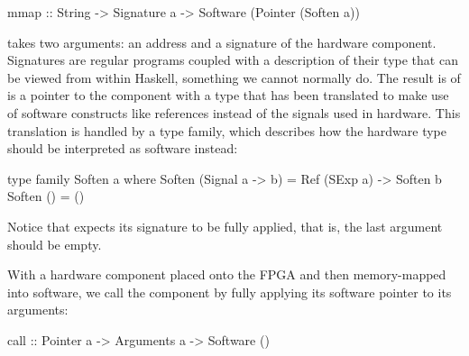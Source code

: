 \documentclass[../main.tex]{subfiles}
\begin{document}
\begin{code}
mmap :: String -> Signature a -> Software (Pointer (Soften a))
\end{code}

 takes two arguments: an address and a signature of the hardware component. Signatures are regular programs coupled with a description of their type that can be viewed from within Haskell, something we cannot normally do. The result is of  is a pointer to the component with a type that has been translated to make use of software constructs like references instead of the signals used in hardware. This translation is handled by a type family, which describes how the hardware type should be interpreted as software instead:

\begin{code}
type family Soften a where
  Soften (Signal a -> b) = Ref (SExp a) -> Soften b
  Soften ()              = ()
\end{code}

\noindent Notice that  expects its signature to be fully applied, that is, the last argument should be empty.

With a hardware component placed onto the FPGA and then memory-mapped into software, we call the component by fully applying its software pointer to its arguments:

\begin{code}
call :: Pointer a -> Arguments a -> Software ()
\end{code}
\end{document}
